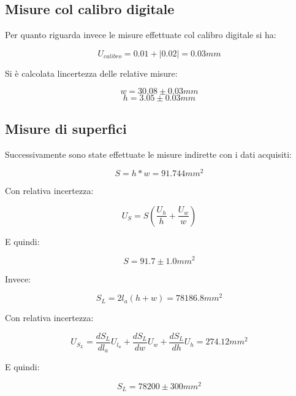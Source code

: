 \documentclass[a4paper]{article}
\begin{document}
\subsection{Misure col calibro digitale}
Per quanto riguarda invece le misure effettuate col calibro digitale si ha: 
\begin{Large} 
	\begin{equation}
		U_{calibro} = 0.01 + |0.02| = 0.03mm
	 \end{equation}
\end{Large}
Si è calcolata lincertezza delle relative misure: 
\begin{Large} 
	\begin{equation}
		w = 30.08\pm0.03mm
	 \end{equation}
	 \begin{equation}
		h = 3.05\pm0.03mm
	 \end{equation}
\end{Large}
\subsection{Misure di superfici}
Successivamente sono state effettuate le misure indirette con i dati acquisiti:
\begin{Large} 
	\begin{equation}
		S = h*w = 91.744 mm^2
	 \end{equation}
\end{Large}
Con relativa incertezza:
\begin{Large} 
	\begin{equation}
		U_{S} =S(\frac{U_h}{h}+\frac{U_w}{w})
	 \end{equation}
\end{Large}
E quindi: 
\begin{Large} 
	\begin{equation}
		S =91.7\pm 1.0mm^2
	 \end{equation}
\end{Large}
Invece:
\begin{Large} 
	\begin{equation}
		S_L= 2l_a(h+w) = 78186.8 mm^2
	 \end{equation}
\end{Large}
Con relativa incertezza:
\begin{Large} 
	\begin{equation}
		U_{S_L} =\frac{dS_L}{dl_a}U_{l_a}+\frac{dS_L}{dw}U_w+\frac{dS_L}{dh}U_h=274.12 mm^2
	 \end{equation}
\end{Large}
E quindi: 
\begin{Large} 
	\begin{equation}
		S_L =78200\pm 300mm^2
	 \end{equation}
\end{Large}
\end{document}
